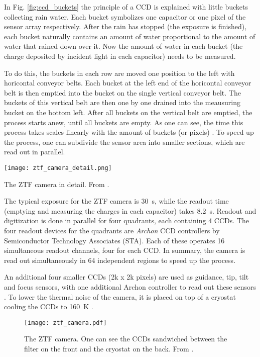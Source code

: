 In Fig. \ref{fig:ccd_buckets} the principle of a CCD is explained with little buckets collecting rain water. Each bucket symbolizes one capacitor or one pixel of the sensor array respectively. After the rain has stopped (the exposure is finished), each bucket naturally contains an amount of water proportional to the amount of water that rained down over it. Now the amount of water in each bucket (the charge deposited by incident light in each capacitor) needs to be measured.

To do this, the buckets in each row are moved one position to the left with horicontal conveyor belts. Each bucket at the left end of the horicontal conveyor belt is then emptied into the bucket on the single vertical conveyor belt. The buckets of this vertical belt are then one by one drained into the meausuring bucket on the bottom left. After all buckets on the vertical belt are emptied, the process starts anew, until all buckets are empty. As one can see, the time this process takes scales linearly with the amount of buckets (or pixels) . To speed up the process, one can subdivide the sensor area into smaller sections, which are read out in parallel.

\begin{marginfigure}
    \texttt{[image: ztf\_camera\_detail.png]}
    \caption[ZTF camera cutaway]{The ZTF camera in detail. From \cite{Dekany2020}.}
\end{marginfigure}

The typical exposure for the ZTF camera is \SI{30}{\second}, while the readout time (emptying and measuring the charges in each capacitor) takes \SI{8.2}{\second}. Readout and digitization is done in parallel for four quadrants, each containing 4 CCDs. The four readout devices for the quadrants are \textit{Archon} CCD controllers by Semiconductor Technology Associates (STA). Each of these operates 16 simultaneous readout channels, four for each CCD. In summary, the camera is read out simultaneously in 64 independent regions to speed up the process.

An additional four smaller CCDs (2k x 2k pixels) are used as guidance, tip, tilt and focus sensors, with one additional Archon controller to read out these sensors . To lower the thermal noise of the camera, it is placed on top of a cryostat cooling the CCDs to \SI{160}{\kelvin} \cite{Dekany2016}.

\begin{figure}[t!]
    \texttt{[image: ztf\_camera.pdf]}
    \caption[ZTF cmera]{The ZTF camera. One can see the CCDs sandwiched between the filter on the front and the cryostat on the back. From \cite{Bellm2019}.}
\end{figure}

